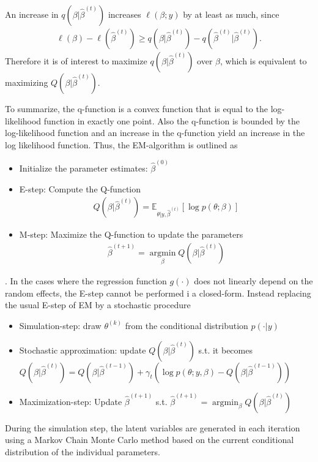 An increase in $q(\beta | \hat{\beta}^{(t)})$ increases $\ell(\beta ; y)$ by at least as much, since
\begin{align*}
    \ell(\beta) - \ell(\hat{\beta}^{(t)}) \geq q(\beta | \hat{\beta}^{(t)}) - q(\hat{\beta}^{(t)} | \hat{\beta}^{(t)}).
\end{align*}
Therefore it is of interest to maximize $q(\beta | \hat{\beta}^{(t)})$ over $\beta$, which is equivalent to maximizing $Q(\beta | \hat{\beta}^{(t)})$.

To summarize, the q-function is a convex function that is equal to the log-likelihood function in exactly one point. Also the q-function is bounded by the log-likelihood function and an increase in the q-function yield an increase in the log likelihood function. Thus, the EM-algorithm is outlined as
\begin{itemize}
    \item Initialize the parameter estimates: $\hat{\beta}^{(0)}$
    \item E-step: Compute the Q-function
    \begin{align*}
        Q(\beta | \hat{\beta}^{(t)}) = \mathbb{E}_{\theta | y, \hat{\beta}^{(t)}} \left[\log p(\theta; \beta) \right]
    \end{align*}
    \item M-step: Maximize the Q-function to update the parameters
    \begin{align*}
        \hat{\beta}^{(t+1)} = \operatorname*{argmin}_\beta Q(\beta | \hat{\beta}^{(t)})
    \end{align*}
\end{itemize} 
\citep{columbia}.
In the cases where the regression function $g(\cdot)$ does not linearly depend on the random effects, the E-step cannot be performed i a closed-form. Instead replacing the usual
E-step of EM by a stochastic procedure

\begin{itemize}
    \item Simulation-step: draw $\theta^{(k)}$ from the conditional distribution $p(\cdot|y)$
    \item Stochastic approximation: update $ Q(\beta | \hat{\beta}^{(t)})$ s.t. it becomes $ Q(\beta | \hat{\beta}^{(t)})= Q(\beta | \hat{\beta}^{(t-1)})+\gamma_t(\log p(\theta; y, \beta)-Q(\beta | \hat{\beta}^{(t-1)}))$
    \item Maximization-step: Update $\hat{\beta}^{(t+1)}$ s.t. $\hat{\beta}^{(t+1)} = \operatorname*{argmin}_\beta Q(\beta | \hat{\beta}^{(t)})$
\end{itemize}
During the simulation step, the latent variables are generated in each iteration using a Markov Chain Monte Carlo method based on the current conditional distribution of the individual parameters. 

